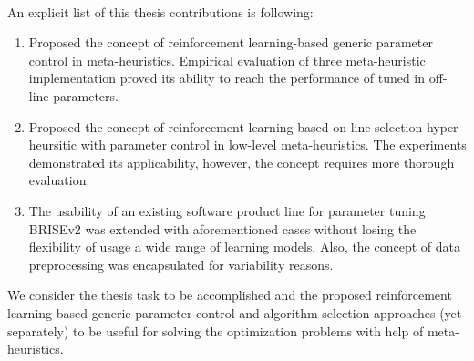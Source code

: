 \paragraph{}
An explicit list of this thesis contributions is following:
\begin{enumerate}
	\item Proposed the concept of reinforcement learning-based generic parameter control in meta-heuristics. Empirical evaluation of three meta-heuristic implementation proved its ability to reach the performance of tuned in off-line parameters.
	\item Proposed the concept of reinforcement learning-based on-line selection hyper-heursitic with parameter control in low-level meta-heuristics. The experiments demonstrated its applicability, however, the concept requires more thorough evaluation.
	\item The usability of an existing software product line for parameter tuning BRISEv2 was extended with aforementioned cases without losing the flexibility of usage a wide range of learning models. Also, the concept of data preprocessing was encapsulated for variability reasons.
\end{enumerate}

We consider the thesis task to be accomplished and the proposed reinforcement learning-based generic parameter control and algorithm selection approaches (yet separately) to be useful for solving the optimization problems with help of meta-heuristics.